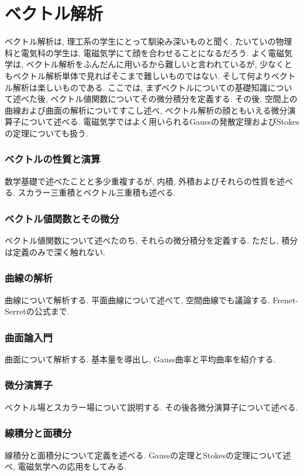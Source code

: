 \documentclass[a4j,dvipdfmx]{jsarticle}
\numberwithin{equation}{section}
\begin{document}
    \part{ベクトル解析}
    \begin{screen}
        ベクトル解析は, 理工系の学生にとって馴染み深いものと聞く. たいていの物理科と電気科の学生は, 電磁気学にて顔を合わせることになるだろう.
        よく電磁気学は, ベクトル解析をふんだんに用いるから難しいと言われているが, 少なくともベクトル解析単体で見ればそこまで難しいものではない. 
        そして何よりベクトル解析は楽しいものである. ここでは, まずベクトルについての基礎知識について述べた後, ベクトル値関数についてその微分積分を定義する.
        その後, 空間上の曲線および曲面の解析についてすこし述べ, ベクトル解析の顔ともいえる微分演算子について述べる.
        電磁気学ではよく用いられるGaussの発散定理およびStokesの定理についても扱う. 
    \end{screen}
    \clearpage
    \section{ベクトルの性質と演算}
        数学基礎で述べたことと多少重複するが, 内積, 外積およびそれらの性質を述べる. スカラー三重積とベクトル三重積も述べる.
    \clearpage
    \section{ベクトル値関数とその微分}
        ベクトル値関数について述べたのち, それらの微分積分を定義する. ただし, 積分は定義のみで深く触れない.
    \clearpage
    \section{曲線の解析}
        曲線について解析する. 平面曲線について述べて, 空間曲線でも議論する. Frenet-Serretの公式まで.
    \clearpage
    \section{曲面論入門}
        曲面について解析する. 基本量を導出し, Gauss曲率と平均曲率を紹介する.
    \clearpage
    \section{微分演算子}
        ベクトル場とスカラー場について説明する. その後各微分演算子について述べる.
    \clearpage
    \section{線積分と面積分}
        線積分と面積分について定義を述べる. Gaussの定理とStokesの定理について述べ, 電磁気学への応用をしてみる.
    \clearpage
\end{document}
